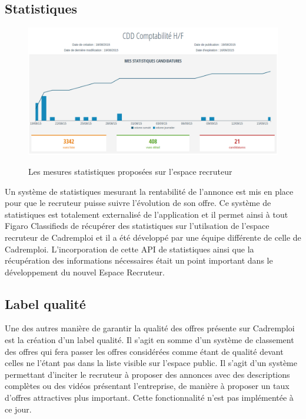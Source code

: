\subsection{Statistiques}
\label{sub:Statistiques}
\begin{figure}[h]
  \begin{center}
    \hspace*{-1in}
    \includegraphics[width=1.2\textwidth]{Pictures/stats.png}
    \label{pic:suivi client backoffice}
    \caption{Les mesures statistiques proposées sur l'espace recruteur}
  \end{center}
\end{figure}
Un système de statistiques mesurant la rentabilité de l'annonce est mis en place pour que le recruteur puisse suivre l'évolution de son offre.
Ce système de statistiques est totalement externalisé de l'application et il permet ainsi à tout Figaro Classifieds de récupérer des statistiques sur l'utilsation de l'espace recruteur de Cadremploi et il a été développé par une équipe différente de celle de Cadremploi.
L'incorporation de cette API de statistiques ainsi que la récupération des informations nécessaires était un point important dans le développement du nouvel Espace Recruteur.

\subsection{Label qualité}
\label{sub:Label qualité}
Une des autres manière de garantir la qualité des offres présente sur Cadremploi est la création d'un label qualité.
Il s'agit en somme d'un système de classement des offres qui fera passer les offres considérées comme étant de qualité devant celles ne l'étant pas dans la liste visible sur l'espace public.
Il s'agit d'un système permettant d'inciter le recruteur à proposer des annonces avec des descriptions complètes ou des vidéos présentant l'entreprise, de manière à proposer un taux d'offres attractives plus important.
Cette fonctionnalité n'est pas implémentée à ce jour.

